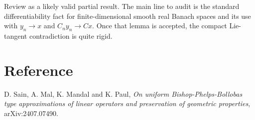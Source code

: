 \documentclass[11pt]{article}
\begin{document}
Review as a likely valid partial result.  The main line to audit is the
standard differentiability fact for finite-dimensional smooth real Banach
spaces and its use with \(y_n\to x\) and \(C_ny_n\to Cx\).  Once that lemma is
accepted, the compact Lie-tangent contradiction is quite rigid.

\section*{Reference}

D. Sain, A. Mal, K. Mandal and K. Paul, \emph{On uniform
Bishop-Phelps-Bollobas type approximations of linear operators and preservation
of geometric properties}, arXiv:2407.07490.
\end{document}

